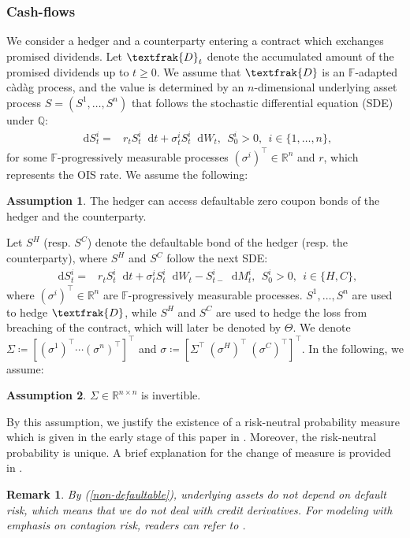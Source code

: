 \documentclass[a4paper, 11pt]{article}              %
\numberwithin{equation}{section}
\theoremstyle{plain}
\newcommand{\1}{\mathds{1}}
\newcommand{\frD}{\textfrak{D}}
\newcommand{\dsF}{\mathbb{F}}
\newcommand{\dsQ}{\mathbb{Q}}
\newcommand{\dsR}{\mathbb{R}}
\newcommand{\IT}{^i_t}
\theoremstyle{plain}
\newtheorem{assumption}[thm]{Assumption}
\theoremstyle{definition}
\newtheorem{remark}[thm]{Remark} %
\newtheorem{assumption}{Assumption}
\theoremstyle{plain}
\newtheorem{remark}{Remark}
\newcommand*\df{\mathop{}\!\mathrm{d}}
\begin{document}
\subsubsection{Cash-flows}
We consider a hedger and a counterparty entering a contract which exchanges
promised dividends. Let $\frD_t$ denote the accumulated amount of the promised
dividends up to $t \geq0$. We assume that $\frD$ is an $\dsF$-adapted c\`ad\`ag
process, and the value is determined by an $n$-dimensional underlying asset
process $S=(S^1, \dots, S^n)$ that follows the  stochastic differential
equation (SDE) under $\dsQ$:
\begin{align}
  \df S\IT =& r_tS\IT \df t + \sigma\IT S\IT \df W^{}_t, ~~S_0^i >0, 
~~i \in\{ 1, \dots, n\},\label{non-defaultable}
\end{align}
for some $\dsF$-progressively measurable processes $(\sigma^i)^\top\in \dsR^n$ and
$r$, which represents the OIS rate. We assume the following:
\begin{assumption}
 The hedger can access  defaultable zero coupon bonds of the 
hedger and the counterparty.  
\end{assumption}
Let $S^H$ (resp. $S^C$) denote the defaultable bond of
the hedger  (resp. the counterparty), where $S^H$ and $S^C$ follow the next SDE:
\begin{align}
  \df S\IT =& r_tS\IT \df t + \sigma\IT S\IT \df W^{}_t-S^i_{t-}\df M^i_t,~~S_0^i>0,
              ~~i \in\{ H, C\},\label{defaultable}
\end{align} 
where $(\sigma^i)^{\top} \in \dsR^{n}$ are $\dsF$-progressively measurable
processes. $S^1, \dots, S^n$ are used to hedge $\frD$, while $S^H$ and $S^C$ are
used to hedge the loss from breaching of the contract,
which will later be denoted by $\Theta$.  We denote
$\Sigma\coloneqq [(\sigma^1)^\top \cdots (\sigma^n)^\top]^\top$ and
$\sigma \coloneqq [\Sigma^\top~ (\sigma^H)^\top~ (\sigma^C)^\top]^{\top}$. In the following, we assume:
\begin{assumption}
$\Sigma\in \dsR^{n\times n}$ is invertible.  
\end{assumption}
By this assumption, we justify the existence of a risk-neutral probability
measure which is given in the early stage of this paper in
. Moreover, the risk-neutral probability is unique. A brief
explanation for the change of measure is provided in .
\begin{remark}
  By (\ref{non-defaultable}), underlying assets do not depend on default risk,
  which means that we do not deal with credit derivatives. For modeling with
  emphasis on contagion risk, readers can refer to
  \cite{jiao2013optimal, brigo2014arbitrage, bo2019locally, bo2017credit}. 
\end{remark}
\end{document}
